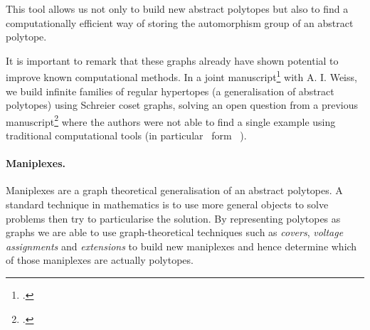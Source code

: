 This tool allows us not only to build new abstract polytopes but also to find a computationally efficient way of storing the automorphism group of an abstract polytope.

It is important to remark that these graphs already have shown potential to improve known computational methods.
In a joint manuscript\footcite{MonteroWeiss_2021_ProperLocallySpherical} with A. I. Weiss, we build infinite families of regular hypertopes (a generalisation of abstract polytopes) using Schreier coset graphs, solving an open question from a previous manuscript\footcite{FernandesLeemansWeiss_2020_ExplorationLocallySpherical} where the authors were not able to find a single example using traditional computational tools (in particular \lins\ form \magma\ ).

\paragraph{Maniplexes.} Maniplexes are a graph theoretical generalisation of an abstract polytopes. A standard technique in mathematics is to use more general objects to solve problems then try to particularise the solution.
By representing polytopes as graphs we are able to use graph-theoretical techniques such as \emph{covers}, \emph{voltage assignments} and \emph{extensions} to build new maniplexes and hence determine which of those maniplexes are actually polytopes.


